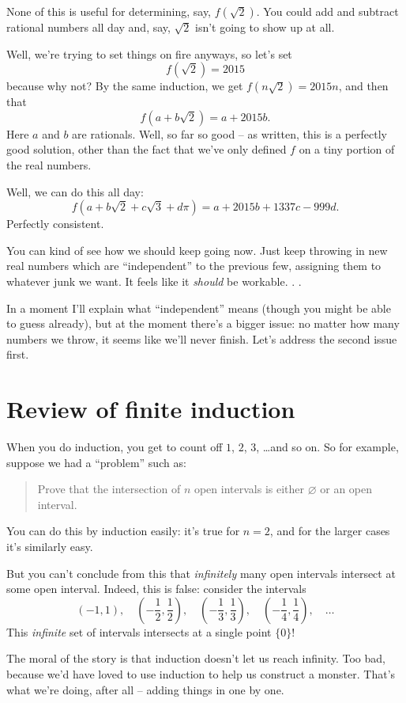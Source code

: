 None of this is useful for determining, say, $f(\sqrt 2)$.
You could add and subtract rational numbers all day
and, say, $\sqrt 2$ isn't going to show up at all.

Well, we're trying to set things on fire anyways, so let's set
\[ f(\sqrt 2) = 2015 \]
because why not?
By the same induction, we get $f(n\sqrt2) = 2015n$, and then that
\[ f\left( a + b \sqrt 2 \right) = a + 2015b. \]
Here $a$ and $b$ are rationals.
Well, so far so good -- as written, this is a perfectly good solution,
other than the fact that we've only defined $f$ on a tiny portion of the real numbers.

Well, we can do this all day:
\[ f\left( a + b \sqrt 2 + c \sqrt 3 + d \pi \right) = a + 2015b + 1337c - 999d. \]
Perfectly consistent.

You can kind of see how we should keep going now.
Just keep throwing in new real numbers which are ``independent''
to the previous few, assigning them to whatever junk we want.
It feels like it \emph{should} be workable. . .

In a moment I'll explain what ``independent'' means (though you
might be able to guess already), but at the moment there's a bigger issue:
no matter how many numbers we throw, it seems like we'll never finish.
Let's address the second issue first.

\section{Review of finite induction}
When you do induction, you get to count off $1$, $2$, $3$, \dots and so on.
So for example, suppose we had a ``problem'' such as:
\begin{quote}
	Prove that the intersection of $n$ open intervals is either $\varnothing$
	or an open interval.
\end{quote}
You can do this by induction easily: it's true for $n = 2$, and
for the larger cases it's similarly easy.

But you can't conclude from this that \emph{infinitely} many open intervals intersect
at some open interval. Indeed, this is false: consider the intervals
\[
	\left( -1, 1 \right), \quad
	\left( -\frac12, \frac12 \right), \quad
	\left( -\frac13, \frac13 \right), \quad
	\left( -\frac14, \frac14 \right), \quad
	\dots
\]
This \emph{infinite} set of intervals intersects at a single point $\{0\}$!

The moral of the story is that induction doesn't let us reach infinity.
Too bad, because we'd have loved to use induction to help us construct a monster.
That's what we're doing, after all -- adding things in one by one.

